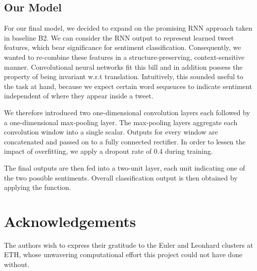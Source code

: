 \documentclass[10pt,conference,compsocconf]{IEEEtran}
\begin{document}
\subsection{Our Model}

For our final model, we decided to expand on the promising RNN
approach taken in baseline B2. We can consider the RNN output to
represent learned tweet features, which bear significance for
sentiment classification. Consequently, we wanted to re-combine these
features in a structure-preserving, context-sensitive
manner. Convolutional neural networks fit this bill and in addition
possess the property of being invariant w.r.t
translation. Intuitively, this sounded useful to the task at hand,
because we expect certain word sequences to indicate sentiment
independent of where they appear inside a tweet.

We therefore introduced two one-dimensional convolution layers each
followed by a one-dimensional max-pooling layer. The max-pooling
layers aggregate each convolution window into a single scalar. Outputs
for every window are concatenated and passed on to a fully connected
rectifier. In order to lessen the impact of overfitting, we apply a
dropout rate of 0.4 during training.

The final outputs are then fed into a two-unit layer, each unit
indicating one of the two possible sentiments. Overall classification
output is then obtained by applying the  function.

\section*{Acknowledgements}

The authors wish to express their gratitude to the Euler and Leonhard
clusters at ETH, whose unwavering computational effort this project
could not have done without.



\end{document}
